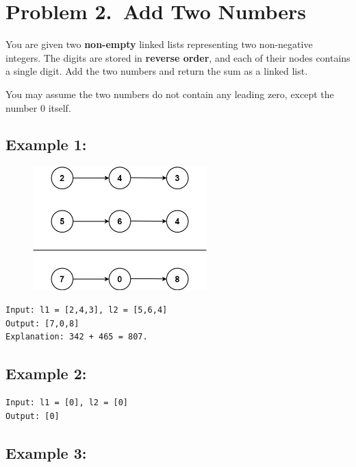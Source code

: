 
\section*{Problem 2.~Add Two Numbers}

You are given two \textbf{non-empty} linked lists representing two non-negative integers. The digits are stored in \textbf{reverse order}, and each of their nodes contains a single digit. Add the two numbers and return the sum as a linked list.

You may assume the two numbers do not contain any leading zero, except the number 0 itself.


\subsection*{Example 1:}

\begin{figure}[h!]
  \includegraphics[width=0.6\textwidth]{img/addtwonumber1.jpg}
  \centering
\end{figure}

\begin{lstlisting}
Input: l1 = [2,4,3], l2 = [5,6,4]
Output: [7,0,8]
Explanation: 342 + 465 = 807.
\end{lstlisting}


\subsection*{Example 2:}

\begin{lstlisting}
Input: l1 = [0], l2 = [0]
Output: [0]
\end{lstlisting}


\subsection*{Example 3:}

